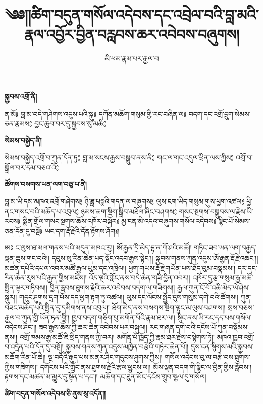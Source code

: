\documentclass[duplex]{pecha}
\author{མི་ཕམ་རྣམ་པར་རྒྱལ་བ}
\title{༄༅།།ཚིག་བདུན་གསོལ་འདེབས་དང་འབྲེལ་བའི་བླ་མའི་རྣལ་འབྱོར་བྱིན་བརླབས་ཆར་འབེབས་བཞུགས།}
\begin{document}
\maketitle

\begin{pecha}

{\small\bfseries སྐྱབས་འགྲོ་ནི།}

ན་མོ༔ བླ་མ་བདེ་གཤེགས་འདུས་པའི་སྐུ༔
དཀོན་མཆོག་གསུམ་གྱི་རང་བཞིན་ལ༔
བདག་དང་འགྲོ་དྲུག་སེམས་ཅན་རྣམས༔
བྱང་ཆུབ་བར་དུ་སྐྱབས་སུ་མཆི༔

{\small\bfseries སེམས་བསྐྱེད་ནི།}

སེམས་བསྐྱེད་འགྲོ་བ་ཀུན་དོན་ཏུ༔
བླ་མ་སངས་རྒྱས་བསྒྲུབ་ནས་ནི༔
གང་ལ་གང་འདུལ་ཕྲིན་ལས་ཀྱིས༔
འགྲོ་བ་སྒྲོལ་བར་དམ་བཅའ་འོ༔

{\small\bfseries ཚོགས་བསགས་ཡན་ལག་བཅུ་པ་ནི།}

བླ་མ་ཡི་དམ་མཁའ་འགྲོ་གཤེགས༔
ཉི་ཟླ་པདྨའི་གདན་ལ་བཞུགས༔
ལུས་ངག་ཡིད་གསུམ་གུས་ཕྱག་འཚལ༔
ཕྱི་ནང་གསང་བའི་མཆོད་པ་འབུལ༔
ཉམས་ཆག་སྡིག་སྒྲིབ་མཐོལ་ཞིང་བཤགས༔
གསང་སྔགས་བསྒྲུབས་ལ་རྗེས་ཡི་རངས༔
སྨིན་གྲོལ་གསང་སྔགས་ཆོས་འཁོར་བསྐོར༔
མྱ་ངན་མི་འདའ་བཞུགས་གསོལ་འདེབས༔
སྙིང་པོ་སེམས་ཅན་དོན་དུ་བསྔོ༔
ཡང་དག་རྡོ་རྗེའི་དོན་རྟོགས་ཤོག༔།

ཨཿ ང་ལུས་ཐ་མལ་གནས་པའི་མདུན་མཁའ་རུ།།
ཨོ་རྒྱན་དྲི་མེད་དྷ་ན་ཀོ་ཤའི་མཚོ།།
གཏིང་ཟབ་ཡན་ལག་བརྒྱད་ལྡན་ཆུས་གང་བའི།།
དབུས་སུ་རིན་ཆེན་པད་སྡོང་འདབ་རྒྱས་སྟེང་།།
སྐྱབས་གནས་ཀུན་འདུས་ཨོ་རྒྱན་རྡོ་རྗེ་འཆང་།།
མཚན་དཔེའི་དཔལ་འབར་མཚོ་རྒྱལ་ཡུམ་དང་འཁྲིལ།།
ཕྱག་གཡས་རྡོ་རྗེ་གཡོན་པས་ཐོད་བུམ་བསྣམས།།
དར་དང་རིན་ཆེན་རུས་པའི་རྒྱན་གྱིས་མཛེས།།
འོད་ལྔའི་ཀློང་ནས་བདེ་ཆེན་གཟི་བྱིན་འབར།།
འཁོར་དུ་རྩ་གསུམ་རྒྱ་མཚོ་སྤྲིན་ལྟར་གཏིབས།།
བྱིན་རླབས་ཐུགས་རྗེའི་ཆར་འབེབས་བདག་ལ་གཟིགས།།
རྒྱལ་ཀུན་ངོ་བོ་འཆི་མེད་ཡེ་ཤེས་སྐུར།།
གདུང་ཤུགས་དྲག་པོས་དད་ཕྱག་རྟག་ཏུ་འཚལ།།
ལུས་དང་ལོངས་སྤྱོད་དུས་གསུམ་དགེ་བའི་ཚོགས།།
ཀུན་བཟང་མཆོད་པའི་སྤྲིན་དུ་དམིགས་ནས་འབུལ།།
ཐོག་མེད་ནས་བསགས་སྡིག་ལྟུང་མ་ལུས་བཤགས།།
སྲས་བཅས་རྒྱལ་བ་ཀུན་གྱི་ཡོན་ཏན་གྱི།།
ཁྱབ་བདག་གཅིག་པུ་མགོན་པོའི་རྣམ་ཐར་ལ།།
སྙིང་ནས་ཡི་རང་དད་པས་གསོལ་འདེབས་ཤིང་།།
ཟབ་རྒྱས་ཆོས་ཀྱི་ཆར་ཆེན་འབེབས་པར་བསྐུལ།།
རང་གཞན་དགེ་བའི་དངོས་པོ་ཀུན་བསྡོམས་ནས།།
འགྲོ་ཁམས་རྒྱ་མཚོ་ཇི་སྲིད་གནས་ཀྱི་བར།།
མགོན་པོ་ཁྱོད་ཀྱི་རྣམ་ཐར་རྗེས་བསྙེགས་ཏེ།།
མཁའ་ཁྱབ་འགྲོ་བ་འདྲེན་པའི་དོན་དུ་བསྔོ།།
སྐྱབས་གནས་ཀུན་འདུས་མཁྱེན་བརྩེའི་གཏེར་ཆེན་པོ།།
དུས་ངན་སྙིགས་མའི་སྐྱབས་མཆོག་རིན་པོ་ཆེ།།
ལྔ་བདོའི་རྒུད་པས་མནར་ཤིང་གདུངས་ཤུགས་ཀྱིས།།
གསོལ་འདེབས་བུ་ལ་བརྩེ་བས་ཐུགས་ཀྱིས་གཟིགས།།
དགོངས་པའི་ཀློང་ནས་ཐུགས་རྗེའི་རྩལ་ཕྱུངས་ལ།།
མོས་ལྡན་བདག་གི་སྙིང་ལ་བྱིན་གྱིས་རློབས།།
རྟགས་དང་མཚན་མ་མྱུར་དུ་སྟོན་པ་དང་།།
མཆོག་དང་ཐུན་མོང་དངོས་གྲུབ་སྩལ་དུ་གསོལ།

{\small\bfseries ཚིག་བདུན་གསོལ་འདེབས་ཅི་ནུས་སུ་འདོན།།}


\end{pecha}
\end{document}
